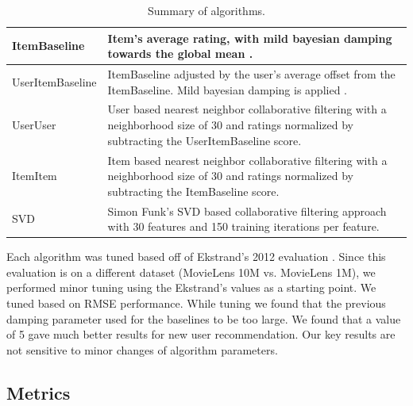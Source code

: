 \documentclass[letterpaper]{sig-alternate}
\begin{document}
  \begin{table}[ht!]
    \centering
    \begin{tabular}{|p{6em}|p{18em}|}
      \hline
      ItemBaseline       & Item's average rating, with mild bayesian damping towards the global mean \cite{funk_netflix_2006}. \\\hline
      UserItem\-Baseline & ItemBaseline adjusted by the user's average offset from the ItemBaseline. Mild bayesian damping is applied \cite{funk_netflix_2006}. \\\hline
      UserUser           & User based nearest neighbor collaborative filtering \cite{resnick1994grouplens} with a neighborhood size of 30 and ratings normalized by subtracting the UserItemBaseline score. \\\hline
      ItemItem           & Item based nearest neighbor collaborative filtering \cite{sarwar2001item} with a neighborhood size of 30 and ratings normalized by subtracting the ItemBaseline score.   \\\hline
      SVD                & Simon Funk's SVD based collaborative filtering approach \cite{funk_netflix_2006} with 30 features and 150 training iterations per feature. \\\hline
    \end{tabular}
    \caption{Summary of algorithms.}
    \label{tbl:algo}
  \end{table}
  
  Each algorithm was tuned based off of Ekstrand's 2012 evaluation \cite{ekstrand2012recommenders}.
  Since this evaluation is on a different dataset (MovieLens 10M vs. MovieLens 1M), we performed minor tuning using the Ekstrand's values as a starting point.
  We tuned based on RMSE performance.
  While tuning  we found that the previous damping parameter used for the baselines to be too large.
  We found that a value of 5 gave much better results for new user recommendation.
  Our key results are not sensitive to minor changes of algorithm parameters.
  


  \subsection*{Metrics}
\end{document}
